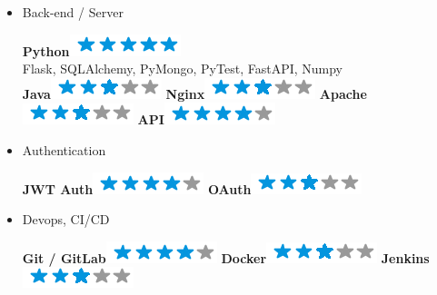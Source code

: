 \documentclass[]{friggeri-cv}
\begin{document}
\begin{flushright}
\begin{multicols}{3}
\begin{itemize}
\columnbreak
\item Back-end / Server \
\begin{flushright}

\textbf{Python}\includegraphics[scale=0.40]{res/img/5stars.png}\\Flask, SQLAlchemy, PyMongo, PyTest, FastAPI, Numpy\\\vspace{2mm}
\textbf{Java}\includegraphics[scale=0.40]{res/img/3stars.png}
\textbf{Nginx}\includegraphics[scale=0.40]{res/img/3stars.png}
\textbf{Apache}\includegraphics[scale=0.40]{res/img/3stars.png}
\textbf{API}\includegraphics[scale=0.40]{res/img/4stars.png}
\end{flushright}            

\item Authentication \
\begin{flushright}

\textbf{JWT Auth}\includegraphics[scale=0.40]{res/img/4stars.png}
\textbf{OAuth}\includegraphics[scale=0.40]{res/img/3stars.png}
\end{flushright}            

\item Devops, CI/CD \
\begin{flushright}

\textbf{Git / GitLab}\includegraphics[scale=0.40]{res/img/4stars.png}
\textbf{Docker}\includegraphics[scale=0.40]{res/img/3stars.png}
\textbf{Jenkins}\includegraphics[scale=0.40]{res/img/3stars.png}
\end{flushright}            


\end{itemize}
\end{multicols}
\end{flushright}
\end{document}
